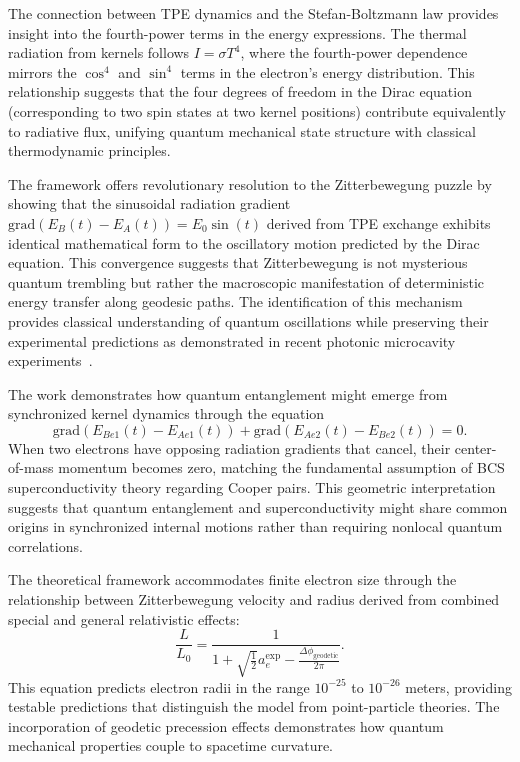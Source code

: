 \documentclass[%
 reprint,
 amsmath,amssymb,
 aps,
]{revtex4-1}
\numberwithin{equation}{section}%
\begin{document}
The connection between TPE dynamics and the Stefan-Boltzmann law provides insight into the fourth-power terms in the energy expressions. The thermal radiation from kernels follows $I = \sigma T^4$, where the fourth-power dependence mirrors the $\cos^4$ and $\sin^4$ terms in the electron's energy distribution. This relationship suggests that the four degrees of freedom in the Dirac equation (corresponding to two spin states at two kernel positions) contribute equivalently to radiative flux, unifying quantum mechanical state structure with classical thermodynamic principles.

The framework offers revolutionary resolution to the Zitterbewegung puzzle by showing that the sinusoidal radiation gradient $\text{grad}(E_B(t) - E_A(t)) = E_0\sin(t)$ derived from TPE exchange exhibits identical mathematical form to the oscillatory motion predicted by the Dirac equation. This convergence suggests that Zitterbewegung is not mysterious quantum trembling but rather the macroscopic manifestation of deterministic energy transfer along geodesic paths. The identification of this mechanism provides classical understanding of quantum oscillations while preserving their experimental predictions as demonstrated in recent photonic microcavity experiments~\cite{walker2013}.

The work demonstrates how quantum entanglement might emerge from synchronized kernel dynamics through the equation
\begin{equation}
\text{grad}(E_{Be1}(t) - E_{Ae1}(t)) + \text{grad}(E_{Ae2}(t) - E_{Be2}(t)) = 0.
\end{equation}
When two electrons have opposing radiation gradients that cancel, their center-of-mass momentum becomes zero, matching the fundamental assumption of BCS superconductivity theory regarding Cooper pairs. This geometric interpretation suggests that quantum entanglement and superconductivity might share common origins in synchronized internal motions rather than requiring nonlocal quantum correlations.

The theoretical framework accommodates finite electron size through the relationship between Zitterbewegung velocity and radius derived from combined special and general relativistic effects: \begin{equation}
\frac{L}{L_0} = \frac{1}{1 + \sqrt{\frac{1}{2}}a_e^{\exp} - \frac{\Delta\phi_{\text{geodetic}}}{2\pi}}.
\end{equation}
This equation predicts electron radii in the range $10^{-25}$ to $10^{-26}$ meters, providing testable predictions that distinguish the model from point-particle theories. The incorporation of geodetic precession effects demonstrates how quantum mechanical properties couple to spacetime curvature.
\end{document}
